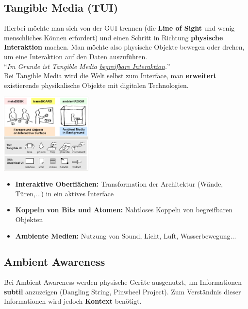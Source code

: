 \documentclass[a4paper]{article}
\begin{document}
\subsection{Tangible Media (TUI)}
Hierbei möchte man sich von der GUI trennen (die \textbf{Line of Sight} und wenig menschliches Können erfordert) und einen Schritt in Richtung \textbf{physische Interaktion} machen. Man möchte also physische Objekte bewegen oder drehen, um eine Interaktion auf den Daten auszuführen. \\

``\textit{Im Grunde ist Tangible Media \underline{begreifbare Interaktion}.}''\\

Bei Tangible Media wird die Welt selbst zum Interface, man \textbf{erweitert} existierende physikalische Objekte mit digitalen Technologien.
\begin{center}
	\includegraphics[height = 4cm]{TUI.png}
\end{center}
\begin{itemize}
	\item \textbf{Interaktive Oberflächen:} Transformation der Architektur (Wände, Türen,...) in ein aktives Interface
	\item \textbf{Koppeln von Bits und Atomen:} Nahtloses Koppeln von begreifbaren Objekten
	\item \textbf{Ambiente Medien:} Nutzung von Sound, Licht, Luft, Wasserbewegung...
\end{itemize}
\subsection{Ambient Awareness}
Bei Ambient Awareness werden physische Geräte ausgenutzt, um Informationen \textbf{subtil} anzuzeigen (Dangling String, Pinwheel Project). Zum Verständnis dieser Informationen wird jedoch \textbf{Kontext} benötigt.
\end{document}
